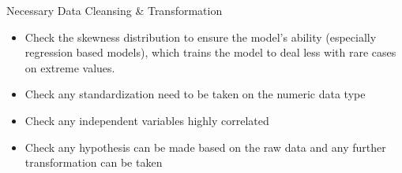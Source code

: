 \documentclass[
 size=14pt,
 paper=smartboard,  %
 mode=present, 		%
 display=slides, 	%
 style=tuliplab,  	%
 pauseslide,
 fleqn,leqno]{powerdot}
\begin{document}
\begin{slide}{Necessary Data Cleansing \& Transformation}
\begin{center}
    \begin{itemize}
    \item Check the skewness distribution to ensure the model’s ability (especially regression based models), which trains the model to deal less with rare cases on extreme values.
    \item Check any standardization need to be taken on the numeric data type
    \item Check any independent variables highly correlated
    \item Check any hypothesis can be made based on the raw data and any further transformation can be taken
    \end{itemize}
\end{center}
\bigskip
\end{slide}
\end{document}
